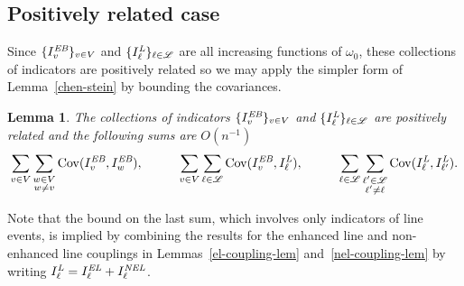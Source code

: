 \documentclass{amsart}
\newcommand{\vect}[1]{{ #1}}
\newcommand{\Cov}{\operatorname{Cov}}
\newcommand{\EB}{I^{\text{\em EB}}}
\newcommand{\Lfoo}{I^{\text{\em L}}}
\newcommand{\EL}{I^{\text{\em EL}}}
\newcommand{\NEL}{I^{\text{\em NEL}}}
\numberwithin{equation}{section}
\newcommand{\lineset}{\mathscr{L}}
\newcommand{\Ln}{\ell}
\newtheorem{lemma}[theorem]{Lemma}
\theoremstyle{definition}
\theoremstyle{remark}
\begin{document}
\subsection*{Positively related case}
Since $\{\EB_{\vect{v}}\}_{\vect{v}\in V}$ and $\{\Lfoo_{\Ln}\}_{\Ln\in \lineset}$ are all increasing functions of $\omega_0$, these collections of indicators are positively related so we may apply the simpler form of Lemma~\ref{chen-stein} by bounding the covariances.
\begin{lemma} 
\label{ebasic-line-lem}
The collections of indicators $\{\EB_{\vect{v}}\}_{\vect{v}\in V}$ and $\{\Lfoo_{\Ln}\}_{\Ln\in \lineset}$ are positively related and the following sums are $O(n^{-1})$
\begin{align*}
\sum_{\vect{v}\in V} \sum_{\substack{\vect{w}\in V\\ \vect{w}\neq \vect{v}}} \Cov(\EB_{\vect{v}},\EB_{\vect{w}}),
 \hspace{1cm} \sum_{\vect{v}\in V} \sum_{\Ln\in\lineset} \Cov(\EB_{\vect{v}},\Lfoo_{\Ln}),
  \hspace{1cm} \sum_{\Ln\in\lineset} \sum_{\substack{\Ln'\in\lineset\\ \Ln'\neq\Ln}} \Cov(\Lfoo_{\Ln},\Lfoo_{\Ln'}).
\end{align*}
\end{lemma}
Note that the bound on the last sum, which involves only indicators of line events, is implied by combining the results for the enhanced line and non-enhanced line couplings in Lemmas~\ref{el-coupling-lem} and~\ref{nel-coupling-lem} by writing $\Lfoo_\Ln = \EL_\Ln + \NEL_\Ln$.
\end{document}
